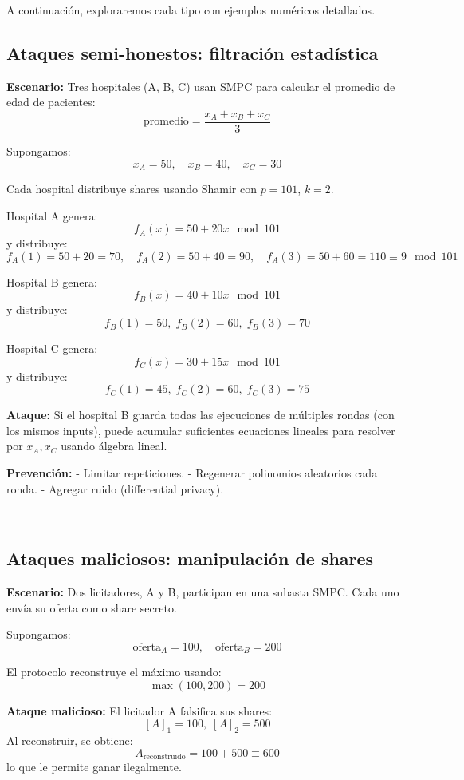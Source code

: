 \documentclass{article}
\begin{document}
A continuación, exploraremos cada tipo con ejemplos numéricos detallados.

\subsection{Ataques semi-honestos: filtración estadística}

\textbf{Escenario:} Tres hospitales (A, B, C) usan SMPC para calcular el promedio de edad de pacientes:
\[
\text{promedio} = \frac{x_A + x_B + x_C}{3}
\]

Supongamos:
\[
x_A = 50, \quad x_B = 40, \quad x_C = 30
\]

Cada hospital distribuye shares usando Shamir con \( p = 101 \), \( k = 2 \).

Hospital A genera:
\[
f_A(x) = 50 + 20x \mod 101
\]
y distribuye:
\[
f_A(1) = 50 + 20 = 70, \quad f_A(2) = 50 + 40 = 90, \quad f_A(3) = 50 + 60 = 110 \equiv 9 \mod 101
\]

Hospital B genera:
\[
f_B(x) = 40 + 10x \mod 101
\]
y distribuye:
\[
f_B(1) = 50, \; f_B(2) = 60, \; f_B(3) = 70
\]

Hospital C genera:
\[
f_C(x) = 30 + 15x \mod 101
\]
y distribuye:
\[
f_C(1) = 45, \; f_C(2) = 60, \; f_C(3) = 75
\]

\textbf{Ataque:} Si el hospital B guarda todas las ejecuciones de múltiples rondas (con los mismos inputs), puede acumular suficientes ecuaciones lineales para resolver por \( x_A, x_C \) usando álgebra lineal.

\textbf{Prevención:}  
- Limitar repeticiones.  
- Regenerar polinomios aleatorios cada ronda.  
- Agregar ruido (differential privacy).

---

\subsection{Ataques maliciosos: manipulación de shares}

\textbf{Escenario:} Dos licitadores, A y B, participan en una subasta SMPC. Cada uno envía su oferta como share secreto.

Supongamos:
\[
\text{oferta}_A = 100, \quad \text{oferta}_B = 200
\]

El protocolo reconstruye el máximo usando:
\[
\max(100, 200) = 200
\]

\textbf{Ataque malicioso:} El licitador A falsifica sus shares:
\[
[A]_1 = 100, \; [A]_2 = 500
\]
Al reconstruir, se obtiene:
\[
A_{\text{reconstruido}} = 100 + 500 \equiv 600
\]
lo que le permite ganar ilegalmente.
\end{document}
